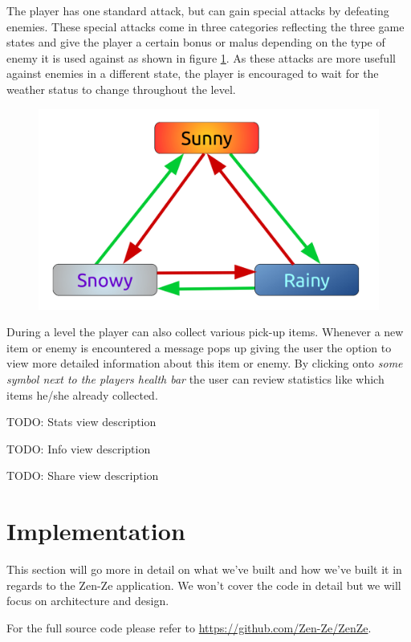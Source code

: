 \documentclass{sigchi}
\begin{document}
The player has one standard attack, but can gain special attacks by defeating enemies. These special attacks come in three categories reflecting the three game states and give the player a certain bonus or malus depending on the type of enemy it is used against as shown in figure \ref{fig:attacks}. As these attacks are more usefull against enemies in a different state, the player is encouraged to wait for the weather status to change throughout the level.

\begin{figure}
\label{fig:attacks}
	\centering
	\includegraphics[width=0.9\columnwidth]{figures/attacks.png}
\end{figure}

During a level the player can also collect various pick-up items. Whenever a new item or enemy is encountered a message pops up giving the user the option to view more detailed information about this item or enemy. By clicking onto \textit{some symbol next to the players health bar} the user can review statistics like which items he/she already collected.

TODO: Stats view description

TODO: Info view description

TODO: Share view description

\section{Implementation}

This section will go more in detail on what we've built and how we've built it in regards to the Zen-Ze application. We won't cover the code in detail but we will focus on architecture and design.

For the full source code please refer to \url{https://github.com/Zen-Ze/ZenZe}.
\end{document}
